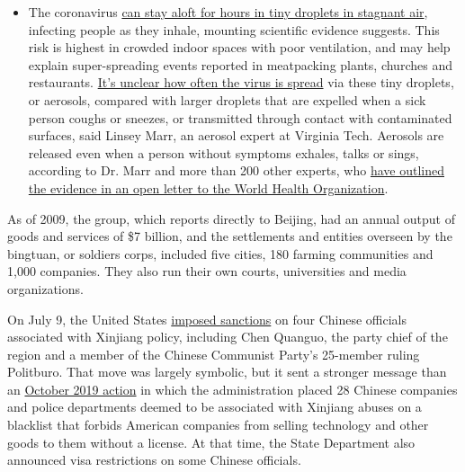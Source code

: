 \begin{itemize}
  \begin{itemize}
  \tightlist
  \item
    The coronavirus
    \href{https://www.nytimes.com/2020/07/04/health/239-experts-with-one-big-claim-the-coronavirus-is-airborne.html?action=click\&pgtype=Article\&state=default\&region=MAIN_CONTENT_3\&context=storylines_faq}{can
    stay aloft for hours in tiny droplets in stagnant air}, infecting
    people as they inhale, mounting scientific evidence suggests. This
    risk is highest in crowded indoor spaces with poor ventilation, and
    may help explain super-spreading events reported in meatpacking
    plants, churches and restaurants.
    \href{https://www.nytimes.com/2020/07/06/health/coronavirus-airborne-aerosols.html?action=click\&pgtype=Article\&state=default\&region=MAIN_CONTENT_3\&context=storylines_faq}{It's
    unclear how often the virus is spread} via these tiny droplets, or
    aerosols, compared with larger droplets that are expelled when a
    sick person coughs or sneezes, or transmitted through contact with
    contaminated surfaces, said Linsey Marr, an aerosol expert at
    Virginia Tech. Aerosols are released even when a person without
    symptoms exhales, talks or sings, according to Dr. Marr and more
    than 200 other experts, who
    \href{https://academic.oup.com/cid/article/doi/10.1093/cid/ciaa939/5867798}{have
    outlined the evidence in an open letter to the World Health
    Organization}.
  \end{itemize}
\end{itemize}

As of 2009, the group, which reports directly to Beijing, had an annual
output of goods and services of \$7 billion, and the settlements and
entities overseen by the bingtuan, or soldiers corps, included five
cities, 180 farming communities and 1,000 companies. They also run their
own courts, universities and media organizations.

On July 9, the United States
\href{https://www.nytimes.com/2020/07/09/world/asia/trump-china-sanctions-uighurs.html}{imposed
sanctions} on four Chinese officials associated with Xinjiang policy,
including Chen Quanguo, the party chief of the region and a member of
the Chinese Communist Party's 25-member ruling Politburo. That move was
largely symbolic, but it sent a stronger message than an
\href{https://www.nytimes.com/2019/10/08/business/china-human-rights-technology-xinjiang.html}{October
2019 action} in which the administration placed 28 Chinese companies and
police departments deemed to be associated with Xinjiang abuses on a
blacklist that forbids American companies from selling technology and
other goods to them without a license. At that time, the State
Department also announced visa restrictions on some Chinese officials.

